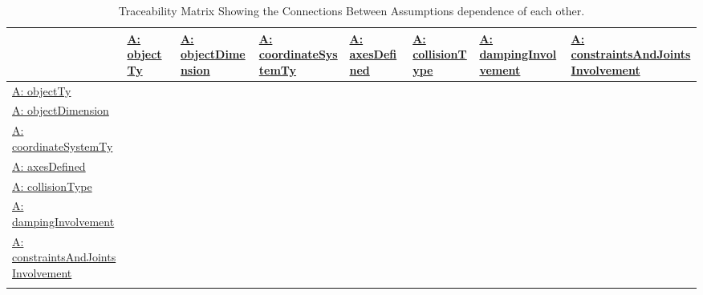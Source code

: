 \documentclass[12pt]{article}
\begin{document}
\begin{longtable}{l l l l l l l l}
\toprule
\textbf{} & \textbf{\hyperref[assumpOT]{A: objectTy}} & \textbf{\hyperref[assumpOD]{A: objectDimension}} & \textbf{\hyperref[assumpCST]{A: coordinateSystemTy}} & \textbf{\hyperref[assumpAD]{A: axesDefined}} & \textbf{\hyperref[assumpCT]{A: collisionType}} & \textbf{\hyperref[assumpDI]{A: dampingInvolvement}} & \textbf{\hyperref[assumpCAJI]{A: constraintsAndJointsInvolvement}}
\\
\midrule
\endhead
\hyperref[assumpOT]{A: objectTy} &  &  &  &  &  &  & 
\\
\hyperref[assumpOD]{A: objectDimension} &  &  &  &  &  &  & 
\\
\hyperref[assumpCST]{A: coordinateSystemTy} &  &  &  &  &  &  & 
\\
\hyperref[assumpAD]{A: axesDefined} &  &  &  &  &  &  & 
\\
\hyperref[assumpCT]{A: collisionType} &  &  &  &  &  &  & 
\\
\hyperref[assumpDI]{A: dampingInvolvement} &  &  &  &  &  &  & 
\\
\hyperref[assumpCAJI]{A: constraintsAndJointsInvolvement} &  &  &  &  &  &  & 
\\
\bottomrule
\caption{Traceability Matrix Showing the Connections Between Assumptions dependence of each other.}
\label{Table:TraceMatAvsA}
\end{longtable}
\end{document}
